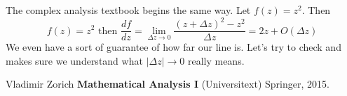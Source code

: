 \documentclass[12pt]{article}
\begin{document}
\newpage \noindent The complex analysis textbook begins the same way.  Let $f(z) = z^2$.  Then 
$$  f(z) = z^2 \text{ then } \frac{df}{dz} = \lim_{\Delta z \to 0} \frac{(z + \Delta z)^2 - z^2}{\Delta z} = 2z + O(\Delta z)$$
We even have a sort of guarantee of how far our line is.  Let's try to check and makes sure we understand what $|\Delta z| \to 0$ really means.
\vfill
\begin{thebibliography}{} 
\item Vladimir Zorich \textbf{Mathematical Analysis I} (Universitext) Springer, 2015.
\end{thebibliography}
\end{document}
